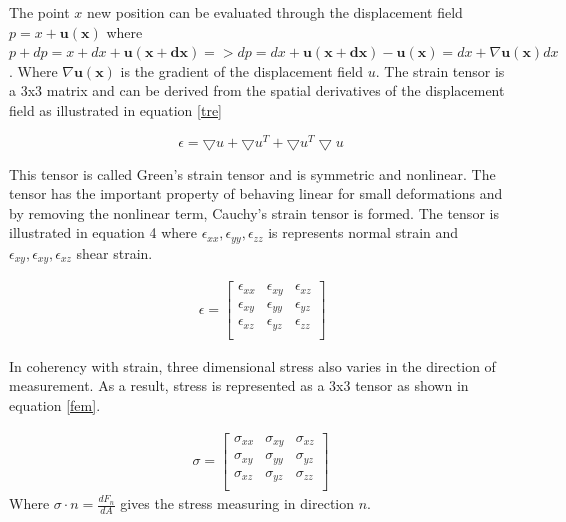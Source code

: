 \documentclass[10pt,a4paper]{article}
\begin{document}
The point $x$ new position can be evaluated through the displacement field $p=x+\mathbf{u(x)}$
where $p+dp = x+dx + \mathbf{u(x+dx)} => dp = dx + \mathbf{u(x+dx)}-\mathbf{u(x)} = dx +\nabla \mathbf{u(x)}dx$. Where $\nabla \mathbf{u(x)}$ is the gradient of the displacement field $u$. The strain tensor is a 3x3 matrix and can be derived from the spatial derivatives of the displacement field as illustrated in equation \ref{tre}

\begin{equation}\label{tre}
    \epsilon = \bigtriangledown u + \bigtriangledown u^{T} + \bigtriangledown u^{T} \bigtriangledown u
\end{equation}

This tensor is called Green's strain tensor and is symmetric and nonlinear. The tensor has the important property of behaving linear for small deformations
and by removing the nonlinear term, Cauchy's strain tensor is formed. The tensor is illustrated in equation 4 where $\epsilon_{xx}, \epsilon_{yy}, \epsilon_{zz}$ is represents normal strain and $\epsilon_{xy}, \epsilon_{xy}, \epsilon_{xz}$  shear strain.

\begin{eqnarray}\
\epsilon =  \left[ \begin{array}{cccc}
\epsilon_{xx} & \epsilon_{xy} & \epsilon_{xz} \\
\epsilon_{xy} & \epsilon_{yy} & \epsilon_{yz} \\
\epsilon_{xz} & \epsilon_{yz} & \epsilon_{zz} \\
 \end{array} \right]
\end{eqnarray}

In coherency with strain, three dimensional stress also varies in the direction of measurement. As a result, stress is represented as a 3x3 tensor as shown in equation \ref{fem}.

\begin{eqnarray}\label{fem}
\sigma =  \left[ \begin{array}{cccc}
\sigma_{xx} & \sigma_{xy} & \sigma_{xz} \\
\sigma_{xy} & \sigma_{yy} & \sigma_{yz} \\
\sigma_{xz} & \sigma_{yz} & \sigma_{zz} \\
 \end{array} \right]
\end{eqnarray}
Where $\sigma \cdot n = \frac{dF_{n}}{dA}$ gives the stress measuring in direction $n$.
\end{document}
